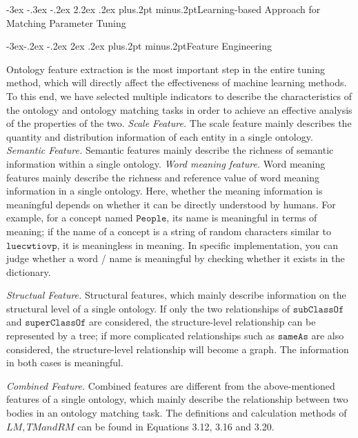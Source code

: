 \documentclass[twoside]{article}
\makeatletter
\def\section{\@startsection{section}{1}{\z@}%
 {-3ex \@plus -.3ex \@minus -.2ex}%
 {2.2ex \@plus.2ex}%
{\normalfont\normalsize\protect\baselineskip=14.5pt plus.2pt minus.2pt\bfseries}}
\def\subsection{\@startsection{subsection}{2}{\z@}%
 {-3ex\@plus -.2ex \@minus -.2ex}%
 {2ex \@plus.2ex}%
{\normalfont\normalsize\protect\baselineskip=12.5pt plus.2pt minus.2pt\bfseries}}
\makeatother
\begin{document}
\section{Learning-based Approach for Matching Parameter Tuning}

\subsection{Feature Engineering}

Ontology feature extraction is the most important step in the entire tuning method, which will directly affect the effectiveness of machine learning methods. To this end, we have selected multiple indicators to describe the characteristics of the ontology and ontology matching tasks in order to achieve an effective analysis of the properties of the two.
{\it Scale Feature.} The scale feature mainly describes the quantity and distribution information of each entity in a single ontology.
{\it Semantic Feature.} Semantic features mainly describe the richness of semantic information within a single ontology.
{\it Word meaning feature.} Word meaning features mainly describe the richness and reference value of word meaning information in a single ontology.
Here, whether the meaning information is meaningful depends on whether it can be directly understood by humans.
For example, for a concept named $\texttt{People}$, its name is meaningful in terms of meaning; if the name of a concept is a string of random characters similar to $\texttt{luecwtiovp}$, it is meaningless in meaning.
In specific implementation, you can judge whether a word / name is meaningful by checking whether it exists in the dictionary.

{\it Structual Feature.}  Structural features, which mainly describe information on the structural level of a single ontology.
If only the two relationships of $\texttt{subClassOf}$ and $\texttt{superClassOf}$ are considered, the structure-level relationship can be represented by a tree; if more complicated relationships such as $\texttt{sameAs}$ are also considered, the structure-level relationship will become a graph. The information in both cases is meaningful.

{\it Combined Feature.} Combined features are different from the above-mentioned features of a single ontology, which mainly describe the relationship between two bodies in an ontology matching task. The definitions and calculation methods of $LM, TM and RM$ can be found in Equations 3.12, 3.16 and 3.20.
\end{document}
